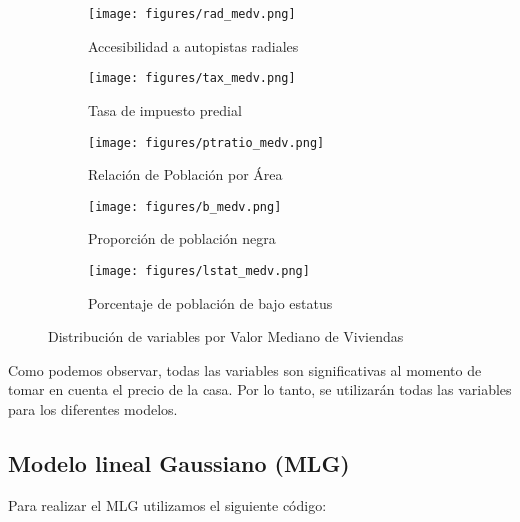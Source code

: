 \documentclass[12pt,a4paper]{article}
\begin{document}
\begin{figure}[H]
\vspace{0.2cm}

\begin{subfigure}[t]{0.24\textwidth}
    \centering
    \texttt{[image: figures/rad\_medv.png]}
    \caption{\footnotesize Accesibilidad a autopistas radiales}
    \label{fig:modelo_rad}
\end{subfigure}
\hfill
\begin{subfigure}[t]{0.24\textwidth}
    \centering
    \texttt{[image: figures/tax\_medv.png]}
    \caption{\footnotesize Tasa de impuesto predial}
    \label{fig:modelo_tax}
\end{subfigure}
\hfill
\begin{subfigure}[t]{0.24\textwidth}
    \centering
    \texttt{[image: figures/ptratio\_medv.png]}
    \caption{\footnotesize Relación de Población por Área}
    \label{fig:modelo_ptratio}
\end{subfigure}
\hfill
\begin{subfigure}[t]{0.24\textwidth}
    \centering
    \texttt{[image: figures/b\_medv.png]}
    \caption{\footnotesize Proporción de población negra}
    \label{fig:modelo_b}
\end{subfigure}

\vspace{0.2cm}

\begin{subfigure}[t]{0.24\textwidth}
    \centering
    \texttt{[image: figures/lstat\_medv.png]}
    \caption{\footnotesize Porcentaje de población de bajo estatus}
    \label{fig:modelo_lstat}
\end{subfigure}

\caption{Distribución de variables por Valor Mediano de Viviendas}
\label{fig:distribucion_variables}
\end{figure}

Como podemos observar, todas las variables son significativas al momento de tomar en cuenta el precio de la casa. Por lo tanto, se utilizarán todas las variables para los diferentes modelos.

\vspace{0.5cm}

\subsection{Modelo lineal Gaussiano (MLG)}

Para realizar el MLG utilizamos el siguiente código:
\end{document}
